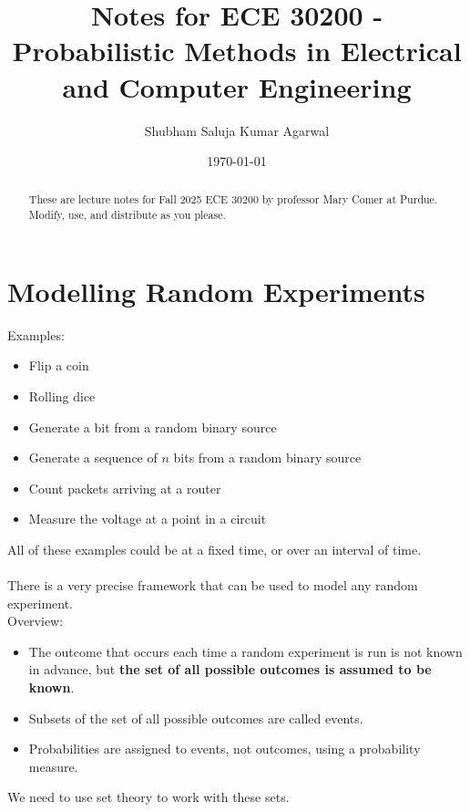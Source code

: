 \documentclass[nobib]{tufte-handout}
\title{Notes for ECE 30200 - Probabilistic Methods in Electrical and Computer Engineering}
\author[Shubham Saluja Kumar Agarwal]{Shubham Saluja Kumar Agarwal}
\date{\today}  %
\begin{document}
\maketitle

\begin{abstract}
    These are lecture notes for Fall 2025 ECE 30200 by professor Mary Comer at Purdue. Modify, use, and distribute as you please.
\end{abstract}

\tableofcontents

\newpage

\section{Modelling Random Experiments}
Examples:
\begin{itemize}
    \item Flip a coin
    \item Rolling dice
    \item Generate a bit from a random binary source
    \item Generate a sequence of $n$ bits from a random binary source
    \item Count packets arriving at a router
    \item Measure the voltage at a point in a circuit
\end{itemize}
All of these examples could be at a fixed time, or over an interval of time.\\~\\
There is a very precise framework that can be used to model any random experiment.\\
Overview:
\begin{itemize}
    \item The outcome that occurs each time a random experiment is run is not known in
          advance, but \textbf{the set of all possible outcomes is assumed to be known}.
    \item Subsets of the set of all possible outcomes are called events.
    \item Probabilities are assigned to events, not outcomes, using a probability
          measure.
\end{itemize}
We need to use set theory to work with these sets.
\end{document}
